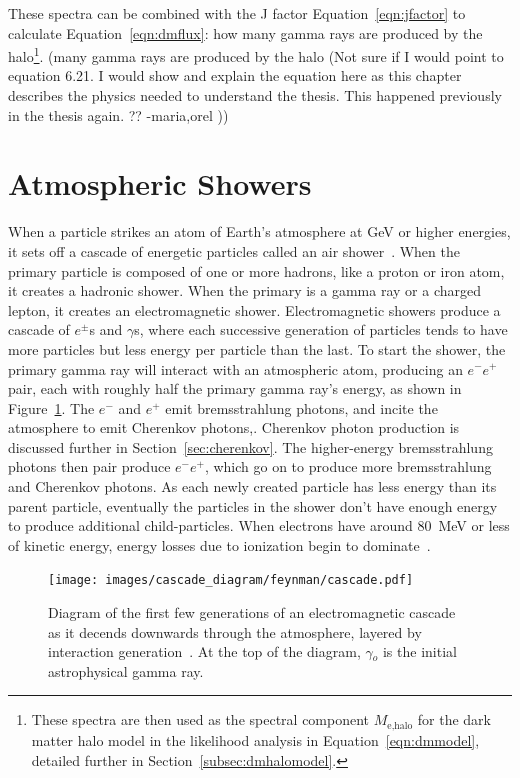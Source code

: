     These spectra can be combined with the J factor Equation~\ref{eqn:jfactor} to calculate Equation~\ref{eqn:dmflux}: how many gamma rays are produced by the halo\footnote{
      These spectra are then used as the spectral component $M_{\textrm{e,halo}}$ for the dark matter halo model in the likelihood analysis in Equation~\ref{eqn:dmmodel}, detailed further in Section~\ref{subsec:dmhalomodel}.
    }.
    {\color{red}(many gamma rays are produced by the halo (Not sure if I would point to equation 6.21. I would show and explain the equation here as this chapter describes the physics needed to understand the thesis. This happened previously in the thesis again. ?? -maria,orel ))}

    \FloatBarrier
    
    
\section{Atmospheric Showers}

  When a particle strikes an atom of Earth's atmosphere at GeV or higher energies, it sets off a cascade of energetic particles called an air shower~\cite{Bethe1934,Klein1999}.
  When the primary particle is composed of one or more hadrons, like a proton or iron atom, it creates a hadronic shower.
  When the primary is a gamma ray or a charged lepton, it creates an electromagnetic shower.
  Electromagnetic showers produce a cascade of $e^{\pm}$s and $\gamma$s, where each successive generation of particles tends to have more particles but less energy per particle than the last.
  To start the shower, the primary gamma ray will interact with an atmospheric atom, producing an $e^{-}e^{+}$ pair, each with roughly half the primary gamma ray's energy, as shown in Figure~\ref{fig:emcascade}.
  The $e^{-}$ and $e^{+}$ emit bremsstrahlung photons, and incite the atmosphere to emit Cherenkov photons,.
  Cherenkov photon production is discussed further in Section~\ref{sec:cherenkov}.
  The higher-energy bremsstrahlung photons then pair produce $e^{-}e^{+}$, which go on to produce more bremsstrahlung and Cherenkov photons.
  As each newly created particle has less energy than its parent particle, eventually the particles in the shower don't have enough energy to produce additional child-particles.
  When electrons have around \SI{80}{MeV} or less of kinetic energy, energy losses due to ionization begin to dominate~\cite{pdg_2014}.

  \begin{figure}[ht]
    \centering
    \texttt{[image: images/cascade\_diagram/feynman/cascade.pdf]}
    \caption[Electromagnetic Cascade]{
      Diagram of the first few generations of an electromagnetic cascade as it decends downwards through the atmosphere, layered by interaction generation~\cite{ellis2017tikz}.
      At the top of the diagram, $\gamma{}_o$ is the initial astrophysical gamma ray.
      \CaptionBlankLine
    }
    \label{fig:emcascade}
  \end{figure}

